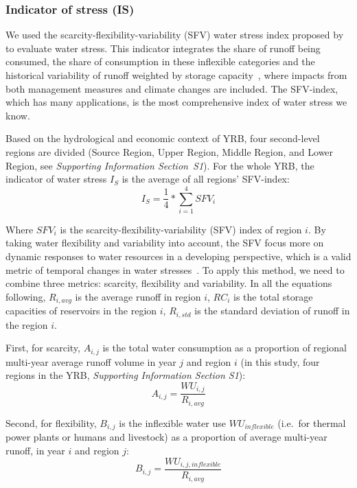 \documentclass[draft]{../agujournal2019}
\begin{document}
	\subsubsection{Indicator of stress (IS)}
	We used the scarcity-flexibility-variability (SFV) water stress index proposed by  to evaluate water stress.
	This indicator integrates the share of runoff being consumed, the share of consumption in these inflexible categories and the historical variability of runoff weighted by storage capacity~\cite{qin2019}, where impacts from both management measures and climate changes are included.
The SFV-index, which has many applications, is the most comprehensive index of water stress we know.

	Based on the hydrological and economic context of YRB, four second-level regions are divided (Source Region, Upper Region, Middle Region, and Lower Region, see \textit{Supporting Information Section~S1}).
	For the whole YRB, the indicator of water stress $I_S$ is the average of all regions' SFV-index:
	\begin{equation}
		I_S = \frac{1}{4} * \sum_{i=1}^4 SFV_{i}
	\end{equation}

	Where $SFV_i$ is the scarcity-flexibility-variability (SFV) index of region $i$. By taking water flexibility and variability into account, the SFV focus more on dynamic responses to water resources in a developing perspective, which is a valid metric of temporal changes in water stresses~\cite{qin2019}. To apply this method, we need to combine three metrics: scarcity, flexibility and variability.
	In all the equations following, $R_{i, avg}$ is the average runoff in region $i$, $RC_i$ is the total storage capacities of reservoirs in the region $i$, $R_{i, std}$ is the standard deviation of runoff in the region $i$.

	First, for scarcity, $A_{i, j}$ is the total water consumption as a proportion of regional multi-year average runoff volume in year $j$ and region $i$ (in this study, four regions in the YRB, \textit{Supporting Information Section S1}):
	\begin{equation}
		A_{i, j} = \frac{WU_{i,j}}{R_{i, avg}}
	\end{equation}

	Second, for flexibility, $B_{i, j}$ is the inflexible water use $WU_{inflexible}$ (i.e.\ for thermal power plants or humans and livestock) as a proportion of average multi-year runoff, in year $i$ and region $j$:
	\begin{equation}
		B_{i, j} = \frac{WU_{i, j, inflexible}}{R_{i, avg}}
	\end{equation}
\end{document}

